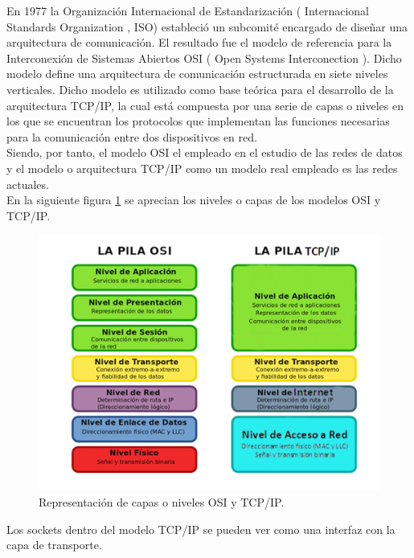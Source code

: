En 1977 la Organización Internacional de Estandarización ( Internacional Standards Organization , ISO) estableció un subcomité encargado de diseñar una arquitectura de
comunicación. El resultado fue el modelo de referencia para la Interconexión de Sistemas Abiertos OSI ( Open Systems Interconection ). Dicho modelo define una arquitectura de
comunicación estructurada en siete niveles verticales. Dicho modelo es utilizado como base teórica para el desarrollo de la arquitectura TCP/IP, la cual está compuesta por una serie de capas
o niveles en los que se encuentran los protocolos que implementan las funciones necesarias para la comunicación entre dos dispositivos en red.\\

Siendo, por tanto, el modelo OSI el empleado en el estudio de las redes de datos y el modelo o arquitectura TCP/IP como un modelo real
empleado es las redes actuales.\\

En la siguiente figura \ref{diagram:modelo-osi-tcp} se aprecian los niveles o capas de los modelos OSI y TCP/IP.\\

\begin{figure}[H]
  \begin{center}
    \includegraphics[scale=0.8]{imagenes/osi-tcp.png}
  \end{center}
  \caption{ Representación de capas o niveles OSI y TCP/IP.}
  \label{diagram:modelo-osi-tcp}
\end{figure}

Los sockets dentro del modelo TCP/IP se pueden ver como una interfaz con la capa de transporte.

